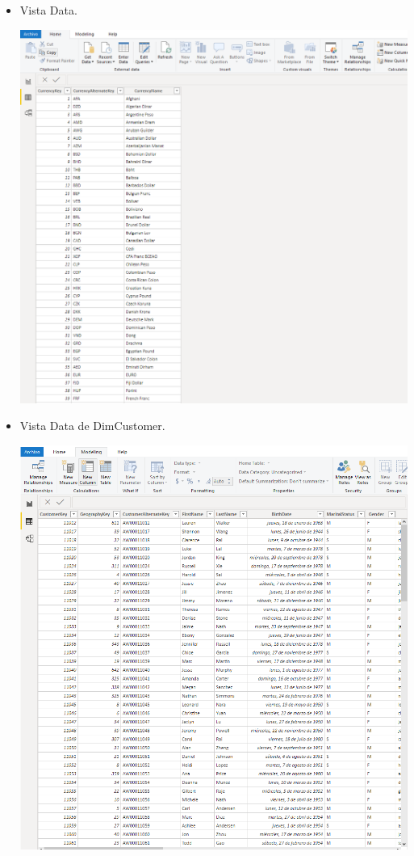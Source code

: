 \begin{itemize}
	\item Vista Data.
	\begin{center}
	\includegraphics[width=13cm]{./Imagenes/Captura3-1} 
	\end{center}
\end{itemize} 

\begin{itemize}
	\item Vista Data de DimCustomer.
	\begin{center}
	\includegraphics[width=13cm]{./Imagenes/Captura3-2} 
	\end{center}
\end{itemize} 

